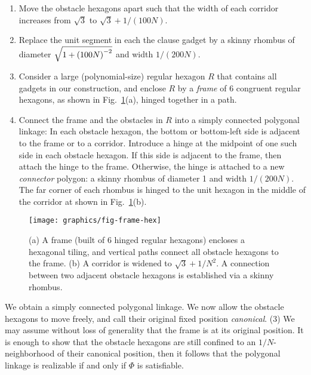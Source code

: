\begin{enumerate}
\item Move the obstacle hexagons apart such that the width of each corridor increases from $\sqrt{3}$ to $\sqrt{3}+1/(100N)$.
\item Replace the unit segment in each the clause gadget by a skinny rhombus of diameter $\sqrt{1 + \left( 100N \right)^{-2}}$ and width $1/(200N)$.
\item Consider a large (polynomial-size) regular hexagon $R$ that contains all gadgets in our construction, and enclose $R$ by a \emph{frame} of 6 congruent regular hexagons, as shown in Fig.~\ref{fig:frame}(a), hinged together in a path.
%
%
\item Connect the frame and the obstacles in $R$ into a simply connected polygonal linkage: In each obstacle hexagon, the bottom or bottom-left side is adjacent to the frame or to a corridor. Introduce a hinge at the midpoint of one such side in each obstacle hexagon. If this side is adjacent to the frame, then attach the hinge to the frame. Otherwise, the hinge is attached to a new \emph{connector} polygon: a skinny rhombus of diameter 1 and width $1/(200N)$. The far corner of each rhombus is hinged to the unit hexagon in the middle of the corridor at shown in Fig.~\ref{fig:frame}(b).
\end{enumerate}

\begin{figure}[htbp]
	\centering
	\texttt{[image: graphics/fig-frame-hex]}
	\caption{(a) A frame (built of 6 hinged regular hexagons) encloses a hexagonal tiling, and
    vertical paths connect all obstacle hexagons to the frame.
    (b) A corridor is widened to $\sqrt{3}+1/N^2$. A connection between
    two adjacent obstacle hexagons is established via a skinny rhombus.}
	\label{fig:frame}
\end{figure}
We obtain a simply connected polygonal linkage. 
We now allow the obstacle hexagons to move freely, and call their original fixed position \emph{canonical}. 
\noindent (3) We may assume without loss of generality that the frame is at its original position. 
It is enough to show that the obstacle hexagons are still confined to an $1/N$-neighborhood of their canonical position, then it
follows that the polygonal linkage is realizable if and only if $\Phi$ is satisfiable.

